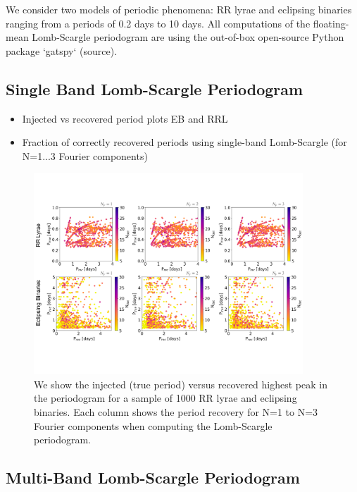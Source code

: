 \documentclass[DM,authoryear,toc]{lsstdoc}
\begin{document}
We consider two models of periodic phenomena: RR lyrae and eclipsing binaries ranging from a periods of 0.2 days to 10 days. All computations of the floating-mean Lomb-Scargle periodogram are using the out-of-box open-source Python package `gatspy` (source). 



\subsection{Single Band Lomb-Scargle Periodogram}

\begin{itemize}
\item Injected vs recovered period plots EB and RRL
\item Fraction of correctly recovered periods using single-band Lomb-Scargle (for N=1...3 Fourier components)  
\end{itemize}

\begin{figure}
  \includegraphics[width=0.9\textwidth]{figures/singleband_lsp.pdf}
  \centering 
  \caption{We show the injected (true period) versus recovered highest peak in the periodogram for a sample of 1000 RR lyrae and eclipsing binaries. Each column shows the period recovery for N=1 to N=3 Fourier components when computing the Lomb-Scargle periodogram.}
  \label{fig:comp}
\end{figure}




\subsection{Multi-Band Lomb-Scargle Periodogram}
\end{document}
